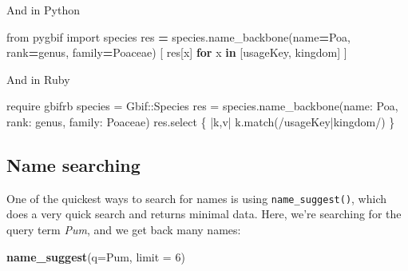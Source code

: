 \documentclass[3p]{elsarticle} %
\newenvironment{Shaded}{\begin{snugshade}}{\end{snugshade}}
\newcommand{\ControlFlowTok}[1]{\textcolor[rgb]{0.13,0.29,0.53}{\textbf{#1}}}
\newcommand{\DataTypeTok}[1]{\textcolor[rgb]{0.13,0.29,0.53}{#1}}
\newcommand{\DecValTok}[1]{\textcolor[rgb]{0.00,0.00,0.81}{#1}}
\newcommand{\ImportTok}[1]{#1}
\newcommand{\KeywordTok}[1]{\textcolor[rgb]{0.13,0.29,0.53}{\textbf{#1}}}
\newcommand{\NormalTok}[1]{#1}
\newcommand{\OperatorTok}[1]{\textcolor[rgb]{0.81,0.36,0.00}{\textbf{#1}}}
\newcommand{\OtherTok}[1]{\textcolor[rgb]{0.56,0.35,0.01}{#1}}
\newcommand{\StringTok}[1]{\textcolor[rgb]{0.31,0.60,0.02}{#1}}
\begin{document}
And in Python

\begin{Shaded}
\begin{Highlighting}[]
\ImportTok{from}\NormalTok{ pygbif }\ImportTok{import}\NormalTok{ species}
\NormalTok{res }\OperatorTok{=}\NormalTok{ species.name\_backbone(name}\OperatorTok{=}\StringTok{\textquotesingle{}Poa\textquotesingle{}}\NormalTok{, rank}\OperatorTok{=}\StringTok{\textquotesingle{}genus\textquotesingle{}}\NormalTok{, family}\OperatorTok{=}\StringTok{\textquotesingle{}Poaceae\textquotesingle{}}\NormalTok{)}
\NormalTok{[ res[x] }\ControlFlowTok{for}\NormalTok{ x }\KeywordTok{in}\NormalTok{ [}\StringTok{\textquotesingle{}usageKey\textquotesingle{}}\NormalTok{, }\StringTok{\textquotesingle{}kingdom\textquotesingle{}}\NormalTok{] ]}
\end{Highlighting}
\end{Shaded}

And in Ruby

\begin{Shaded}
\begin{Highlighting}[]
\NormalTok{require }\StringTok{\textquotesingle{}gbifrb\textquotesingle{}}
\NormalTok{species = }\DataTypeTok{Gbif}\NormalTok{::}\DataTypeTok{Species}
\NormalTok{res = species.name\_backbone(}\StringTok{name: \textquotesingle{}Poa\textquotesingle{}}\NormalTok{, }\StringTok{rank: \textquotesingle{}genus\textquotesingle{}}\NormalTok{, }\StringTok{family: \textquotesingle{}Poaceae\textquotesingle{}}\NormalTok{)}
\NormalTok{res.select \{ |k,v| k.match(}\OtherTok{/usageKey|kingdom/}\NormalTok{) \}}
\end{Highlighting}
\end{Shaded}

\hypertarget{name-searching}{%
\subsection{Name searching}\label{name-searching}}

One of the quickest ways to search for names is using
\texttt{name\_suggest()}, which does a very quick search and returns
minimal data. Here, we're searching for the query term \emph{Pum}, and
we get back many names:

\begin{Shaded}
\begin{Highlighting}[]
\KeywordTok{name\_suggest}\NormalTok{(}\DataTypeTok{q=}\StringTok{\textquotesingle{}Pum\textquotesingle{}}\NormalTok{, }\DataTypeTok{limit =} \DecValTok{6}\NormalTok{)}
\end{Highlighting}
\end{Shaded}
\end{document}
